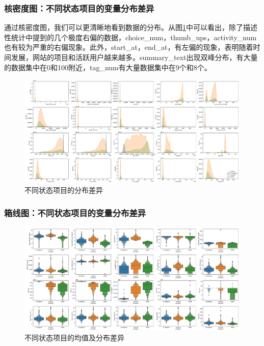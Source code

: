 \documentclass[lang=cn,a4paper]{elegantpaper}
\begin{document}
\subsubsection*{核密度图：不同状态项目的变量分布差异}
通过核密度图，我们可以更清晰地看到数据的分布。从图\ref{fig:displot}中可以看出，除了描述性统计中提到的几个极度右偏的数据，choice\_num，thumb\_ups，activity\_num也有较为严重的右偏现象。此外，start\_at，end\_at，有左偏的现象，表明随着时间发展，网站的项目和活跃用户越来越多。summary\_text出现双峰分布，有大量的数据集中在0和100附近，tag\_num有大量数据集中在9个和8个。
\begin{figure}[!htbp]
  \centering
  \includegraphics[width=\linewidth]{image/hist.pdf}
  \caption{不同状态项目的分布差异}
  \label{fig:displot}
\end{figure}

\subsubsection*{箱线图：不同状态项目的变量分布差异}
\begin{figure}[!htbp]
  \centering
  \includegraphics[width=\linewidth]{image/box.pdf}
  \caption{不同状态项目的均值及分布差异}
  \label{fig:boxenplot}
\end{figure}
\end{document}
